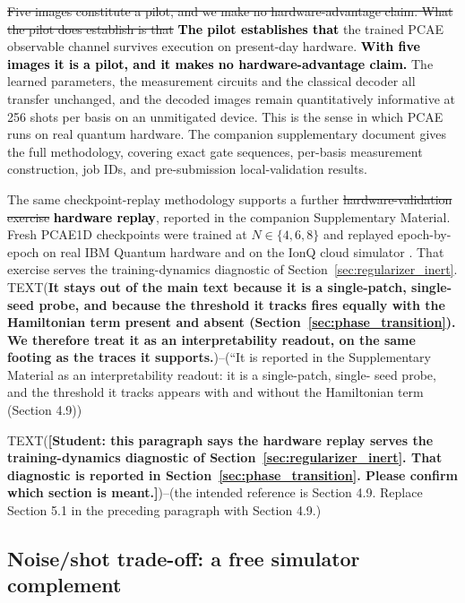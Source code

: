 \documentclass[pdflatex,sn-basic]{sn-jnl}
\newcommand{\del}[1]{\sout{#1}}
\newcommand{\add}[1]{\textbf{\textcolor{black}{#1}}}
\begin{document}
\del{Five images constitute a pilot, and we make no hardware-advantage claim. What
the pilot does establish is that} \add{The pilot establishes that} the trained PCAE observable channel survives
execution on present-day hardware. \add{With five images it is a pilot, and it
makes no hardware-advantage claim.} The learned parameters, the measurement
circuits and the classical decoder all transfer unchanged, and the decoded
images remain quantitatively informative at 256 shots per basis on an
unmitigated device. This is the sense in which PCAE runs on real quantum
hardware. The companion supplementary document gives the full methodology,
covering exact gate sequences, per-basis measurement construction, job IDs, and
pre-submission local-validation results.

The same checkpoint-replay methodology supports a further \del{hardware-validation
exercise} \add{hardware replay}, reported in the companion Supplementary Material. Fresh PCAE1D
checkpoints were trained at $N\in\{4,6,8\}$ and replayed epoch-by-epoch on real
IBM Quantum hardware and on the IonQ cloud simulator \citep{IonQBackends}. That
exercise serves the training-dynamics diagnostic of
Section~\ref{sec:regularizer_inert}. TEXT({\color{red}\textbf{It stays out of the
main text because it is a single-patch, single-seed probe, and because the
threshold it tracks fires equally with the Hamiltonian term present and absent
(Section~\ref{sec:phase_transition}). We therefore treat it as an
interpretability readout, on the same footing as the traces it supports.}})--(“It is reported in the
Supplementary Material as an interpretability readout: it is a single-patch, single-
seed probe, and the threshold it tracks appears with and without the Hamiltonian
term (Section 4.9))


TEXT({\color{red}\textbf{[Student: this paragraph says the hardware replay serves the
training-dynamics diagnostic of Section~\ref{sec:regularizer_inert}. That
diagnostic is reported in Section~\ref{sec:phase_transition}. Please confirm
which section is meant.]}})--(the intended reference is Section 4.9. Replace Section 5.1 in the
preceding paragraph with Section 4.9.)
\color{black}


\subsection{Noise/shot trade-off: a free simulator complement}
\label{sec:hardware_robustness}
\end{document}
